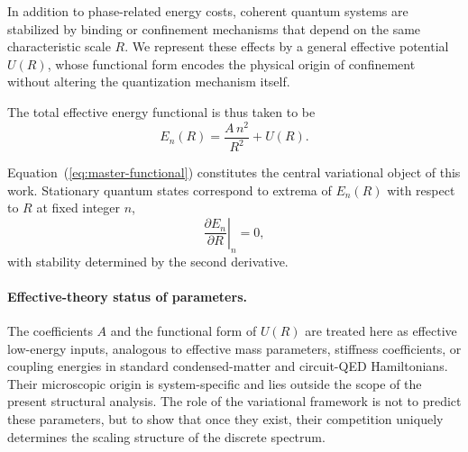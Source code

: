 \documentclass[11pt]{article}
\begin{document}
            In addition to phase-related energy costs, coherent quantum systems are stabilized by binding or confinement mechanisms that depend on the same characteristic scale $R$. We represent these effects by a general effective potential $U(R)$, whose functional form encodes the physical origin of confinement without altering the quantization mechanism itself.

            The total effective energy functional is thus taken to be
            \begin{equation}
                E_n(R)=\frac{A\,n^2}{R^2}+U(R).
                \label{eq:master-functional}
            \end{equation}

            Equation~(\ref{eq:master-functional}) constitutes the central variational object of this work. Stationary quantum states correspond to extrema of $E_n(R)$ with respect to $R$ at fixed integer $n$,
            \begin{equation}
                \left.\frac{\partial E_n}{\partial R}\right|_{n}=0,
                \label{eq:variational-condition}
            \end{equation}
            with stability determined by the second derivative.

            \paragraph{Effective-theory status of parameters.}
            The coefficients $A$ and the functional form of $U(R)$ are treated here as
            effective low-energy inputs, analogous to effective mass parameters,
            stiffness coefficients, or coupling energies in standard condensed-matter
            and circuit-QED Hamiltonians. Their microscopic origin is system-specific
            and lies outside the scope of the present structural analysis. The role of
            the variational framework is not to predict these parameters, but to show
            that once they exist, their competition uniquely determines the scaling
            structure of the discrete spectrum.
\end{document}
